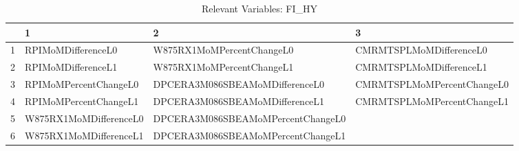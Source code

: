 \begin{longtable}{rlll}
\caption{Relevant Variables: FI_HY} \\ 
  \hline
 & 1 & 2 & 3 \\ 
  \hline
1 & RPIMoMDifferenceL0 & W875RX1MoMPercentChangeL0 & CMRMTSPLMoMDifferenceL0 \\ 
  2 & RPIMoMDifferenceL1 & W875RX1MoMPercentChangeL1 & CMRMTSPLMoMDifferenceL1 \\ 
  3 & RPIMoMPercentChangeL0 & DPCERA3M086SBEAMoMDifferenceL0 & CMRMTSPLMoMPercentChangeL0 \\ 
  4 & RPIMoMPercentChangeL1 & DPCERA3M086SBEAMoMDifferenceL1 & CMRMTSPLMoMPercentChangeL1 \\ 
  5 & W875RX1MoMDifferenceL0 & DPCERA3M086SBEAMoMPercentChangeL0 &  \\ 
  6 & W875RX1MoMDifferenceL1 & DPCERA3M086SBEAMoMPercentChangeL1 &  \\ 
   \hline
\hline
\end{longtable}
